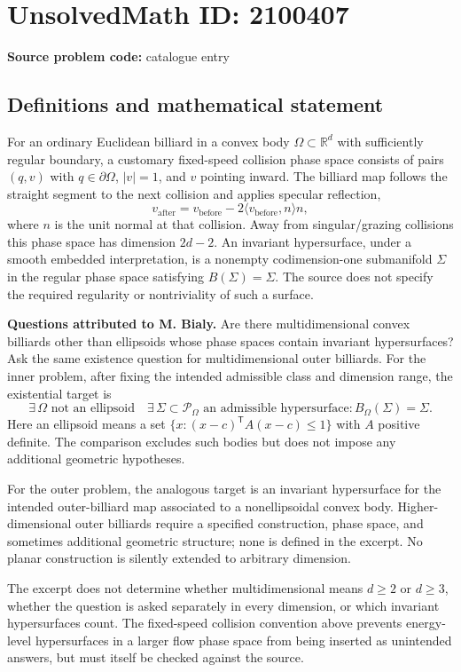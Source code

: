 \documentclass[11pt]{article}
\newcommand{\R}{\mathbb{R}}
\begin{document}
\section*{UnsolvedMath ID: 2100407}
\textbf{Source problem code:} catalogue entry
\subsection{Definitions and mathematical statement}
For an ordinary Euclidean billiard in a convex body $\Omega\subset\R^d$ with sufficiently regular boundary, a customary fixed-speed collision phase space consists of pairs $(q,v)$ with $q\in\partial\Omega$, $|v|=1$, and $v$ pointing inward. The billiard map follows the straight segment to the next collision and applies specular reflection,
\[
 v_{\mathrm{after}}=v_{\mathrm{before}}-2\langle v_{\mathrm{before}},n\rangle n,
\]
where $n$ is the unit normal at that collision. Away from singular/grazing collisions this phase space has dimension $2d-2$. An invariant hypersurface, under a smooth embedded interpretation, is a nonempty codimension-one submanifold $\Sigma$ in the regular phase space satisfying $B(\Sigma)=\Sigma$. The source does not specify the required regularity or nontriviality of such a surface.

\textbf{Questions attributed to M. Bialy.} Are there multidimensional convex billiards other than ellipsoids whose phase spaces contain invariant hypersurfaces? Ask the same existence question for multidimensional outer billiards. For the inner problem, after fixing the intended admissible class and dimension range, the existential target is
\[
 \exists\,\Omega\text{ not an ellipsoid}\quad
 \exists\,\Sigma\subset\mathcal P_\Omega\text{ an admissible hypersurface}:
 B_\Omega(\Sigma)=\Sigma.
\]
Here an ellipsoid means a set $\{x:(x-c)^{\mathsf T}A(x-c)\leq1\}$ with $A$ positive definite. The comparison excludes such bodies but does not impose any additional geometric hypotheses.

For the outer problem, the analogous target is an invariant hypersurface for the intended outer-billiard map associated to a nonellipsoidal convex body. Higher-dimensional outer billiards require a specified construction, phase space, and sometimes additional geometric structure; none is defined in the excerpt. No planar construction is silently extended to arbitrary dimension.

The excerpt does not determine whether multidimensional means $d\geq2$ or $d\geq3$, whether the question is asked separately in every dimension, or which invariant hypersurfaces count. The fixed-speed collision convention above prevents energy-level hypersurfaces in a larger flow phase space from being inserted as unintended answers, but must itself be checked against the source.
\end{document}
